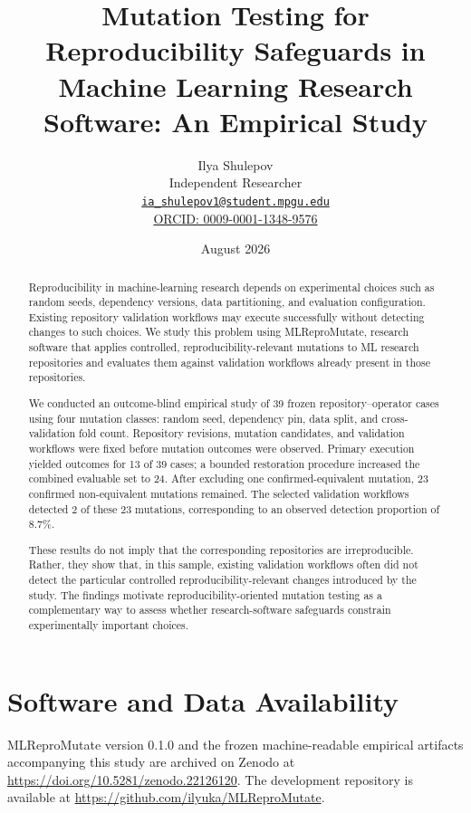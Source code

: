 \documentclass[11pt]{article}
\title{
  Mutation Testing for Reproducibility Safeguards in\\
  Machine Learning Research Software: An Empirical Study
}
\author{
  Ilya Shulepov\\
  \small Independent Researcher\\
  \small \href{mailto:ia_shulepov1@student.mpgu.edu}
              {\texttt{ia\_shulepov1@student.mpgu.edu}}\\
  \small \href{https://orcid.org/0009-0001-1348-9576}
              {ORCID: 0009-0001-1348-9576}
}
\date{August 2026}
\begin{document}
\maketitle

\begin{abstract}
Reproducibility in machine-learning research depends on experimental choices
such as random seeds, dependency versions, data partitioning, and evaluation
configuration. Existing repository validation workflows may execute
successfully without detecting changes to such choices. We study this problem
using MLReproMutate, research software that applies controlled,
reproducibility-relevant mutations to ML research repositories and evaluates
them against validation workflows already present in those repositories.

We conducted an outcome-blind empirical study of 39 frozen
repository--operator cases using four mutation classes: random seed,
dependency pin, data split, and cross-validation fold count. Repository
revisions, mutation candidates, and validation workflows were fixed before
mutation outcomes were observed. Primary execution yielded outcomes for 13 of
39 cases; a bounded restoration procedure increased the combined evaluable set
to 24. After excluding one confirmed-equivalent mutation, 23 confirmed
non-equivalent mutations remained. The selected validation workflows detected
2 of these 23 mutations, corresponding to an observed detection proportion of
8.7\%.

These results do not imply that the corresponding repositories are
irreproducible. Rather, they show that, in this sample, existing validation
workflows often did not detect the particular controlled
reproducibility-relevant changes introduced by the study. The findings motivate
reproducibility-oriented mutation testing as a complementary way to assess
whether research-software safeguards constrain experimentally important
choices.
\end{abstract}













\section*{Software and Data Availability}

MLReproMutate version 0.1.0 and the frozen machine-readable empirical
artifacts accompanying this study are archived on Zenodo at
\url{https://doi.org/10.5281/zenodo.22126120}.
The development repository is available at
\url{https://github.com/ilyuka/MLReproMutate}.

\clearpage




\end{document}
